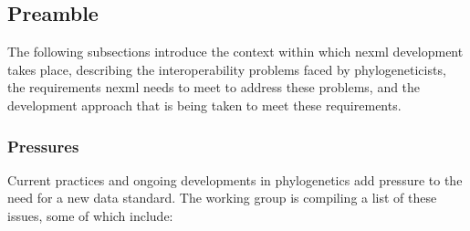 \documentclass{article}
\begin{document}
\subsection{Preamble}
The following subsections introduce the context within which nexml development takes place, describing 
the interoperability problems faced by phylogeneticists, the requirements nexml needs to meet to address 
these problems, and the development approach that is being taken to meet these requirements.

\subsubsection{Pressures}
Current practices and ongoing developments in phylogenetics add pressure to the need for a new data standard. 
The working group is compiling a list of these issues, 
some of which include:
\end{document}
